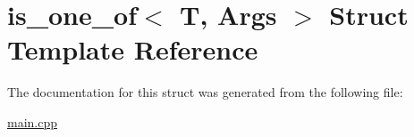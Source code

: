 \hypertarget{structis__one__of}{}\section{is\+\_\+one\+\_\+of$<$ T, Args $>$ Struct Template Reference}
\label{structis__one__of}


The documentation for this struct was generated from the following file\+:\begin{DoxyCompactItemize}
\item 
\hyperlink{main_8cpp}{main.\+cpp}\end{DoxyCompactItemize}
